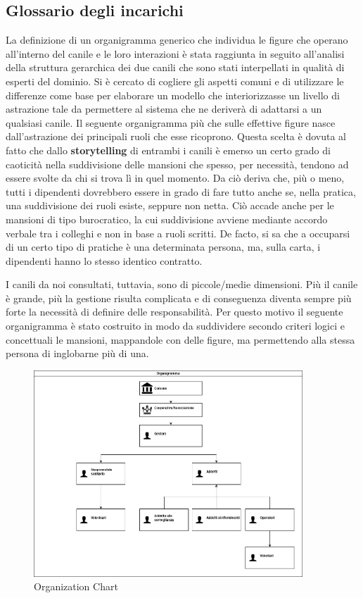     
    \subsection{Glossario degli incarichi}

        La definizione di un organigramma generico che individua le figure che operano all'interno del canile e le loro interazioni è stata raggiunta in seguito all'analisi della struttura gerarchica dei due canili che sono stati interpellati in qualità di esperti del dominio. Si è cercato di cogliere gli aspetti comuni e di utilizzare le differenze come base per elaborare un modello che interiorizzasse un livello di astrazione tale da permettere al sistema che ne deriverà di adattarsi a un qualsiasi canile. Il seguente organigramma più che sulle effettive figure nasce dall'astrazione dei principali ruoli che esse ricoprono. Questa scelta è dovuta al fatto che dallo \textbf{storytelling} di entrambi i canili è emerso un certo grado di caoticità nella suddivisione delle mansioni che spesso, per necessità, tendono ad essere svolte da chi si trova lì in quel momento. Da ciò deriva che, più o meno, tutti i dipendenti dovrebbero essere in grado di fare tutto anche se, nella pratica, una suddivisione dei ruoli esiste, seppure non netta. Ciò accade anche per le mansioni di tipo burocratico, la cui suddivisione avviene mediante accordo verbale tra i colleghi e non in base a ruoli scritti. De facto, si sa che a occuparsi di un certo tipo di pratiche è una determinata persona, ma, sulla carta, i dipendenti hanno lo stesso identico contratto.
        
        I canili da noi consultati, tuttavia, sono di piccole/medie dimensioni. Più il canile è grande, più la gestione risulta complicata e di conseguenza diventa sempre più forte la necessità di definire delle responsabilità. Per questo motivo il seguente organigramma è stato costruito in modo da suddividere secondo criteri logici e concettuali le mansioni, mappandole con delle figure, ma permettendo alla stessa persona di inglobarne più di una.
        
        \begin{figure}[ht]
            \caption{Organization Chart}
            \centering
            \includegraphics[width=0.9\textwidth]{DrawIo/organizationChart.png}
        \end{figure}
